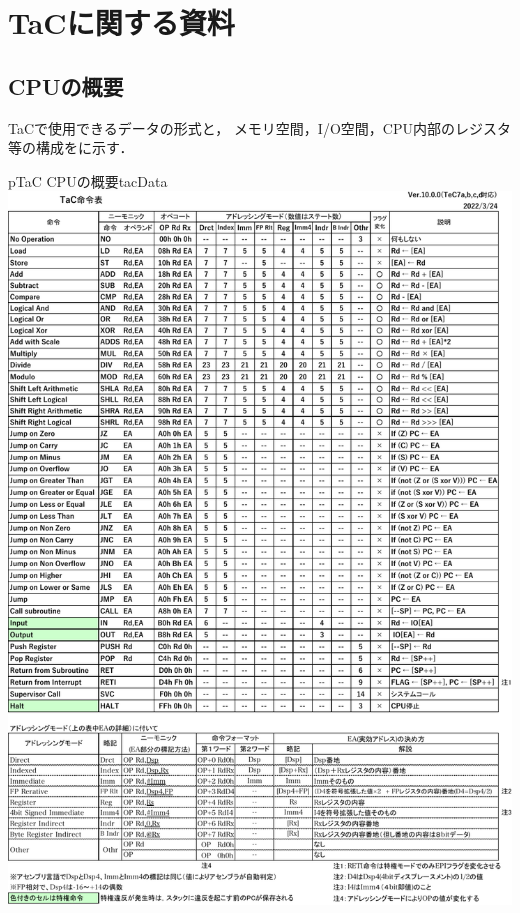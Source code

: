 \chapter{TaCに関する資料}
\label{appTac}

\section{{\tac} CPUの概要}
TaCで使用できるデータの形式と，
メモリ空間，I/O空間，CPU内部のレジスタ等の構成をに示す．

\begin{myfig}{p}{TaC CPUの概要}{tacData}
  \includegraphics[scale=0.86,page=2]{Fig/TacInst-crop.pdf}
\end{myfig}

